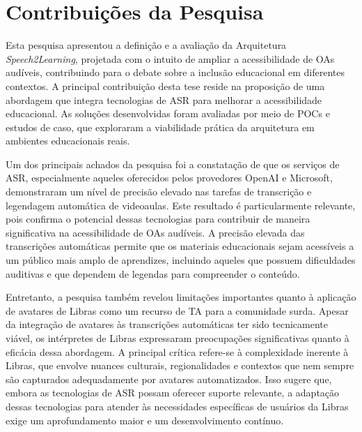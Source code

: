 

\section{Contribuições da Pesquisa}

Esta pesquisa apresentou a definição e a avaliação da Arquitetura \textit{Speech2Learning}, projetada com o intuito de ampliar a acessibilidade de OAs audíveis, contribuindo para o debate sobre a inclusão educacional em diferentes contextos. A principal contribuição desta tese reside na proposição de uma abordagem que integra tecnologias de ASR para melhorar a acessibilidade educacional. As soluções desenvolvidas foram avaliadas por meio de POCs e estudos de caso, que exploraram a viabilidade prática da arquitetura em ambientes educacionais reais.

Um dos principais achados da pesquisa foi a constatação de que os serviços de ASR, especialmente aqueles oferecidos pelos provedores OpenAI e Microsoft, demonstraram um nível de precisão elevado nas tarefas de transcrição e legendagem automática de videoaulas. Este resultado é particularmente relevante, pois confirma o potencial dessas tecnologias para contribuir de maneira significativa na acessibilidade de OAs audíveis. A precisão elevada das transcrições automáticas permite que os materiais educacionais sejam acessíveis a um público mais amplo de aprendizes, incluindo aqueles que possuem dificuldades auditivas e que dependem de legendas para compreender o conteúdo.

Entretanto, a pesquisa também revelou limitações importantes quanto à aplicação de avatares de Libras como um recurso de TA para a comunidade surda. Apesar da integração de avatares às transcrições automáticas ter sido tecnicamente viável, os intérpretes de Libras expressaram preocupações significativas quanto à eficácia dessa abordagem. A principal crítica refere-se à complexidade inerente à Libras, que envolve nuances culturais, regionalidades e contextos que nem sempre são capturados adequadamente por avatares automatizados. Isso sugere que, embora as tecnologias de ASR possam oferecer suporte relevante, a adaptação dessas tecnologias para atender às necessidades específicas de usuários da Libras exige um aprofundamento maior e um desenvolvimento contínuo.

